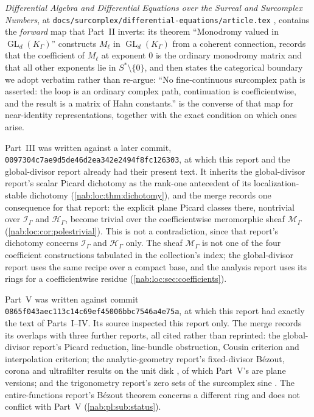 \documentclass[11pt,letterpaper]{article}
\theoremstyle{definition}
\theoremstyle{remark}
\newcommand{\HH}{\mathscr H_\Gamma}
\newcommand{\II}{\mathscr I_\Gamma}
\newcommand{\K}{K_\Gamma}
\newcommand{\GL}{\operatorname{GL}}
\newcommand{\MM}{\mathscr M_\Gamma}
\numberwithin{equation}{section}
\begin{document}
\emph{Differential Algebra and Differential Equations over the Surreal and
Surcomplex Numbers}, at
\texttt{docs/surcomplex/differential-equations/article.tex}
\cite{RepoDiff}, contains the \emph{forward} map that Part~II inverts: its
theorem ``Monodromy valued in $\GL_d(K_\Gamma)$'' constructs $M_\ell$ in
$\GL_d(\K)$ from a coherent connection, records that the coefficient of
$M_\ell$ at exponent $0$ is the ordinary monodromy matrix and that all other
exponents lie in $S^*\setminus\{0\}$, and then states the categorical
boundary we adopt verbatim rather than re-argue: ``No fine-continuous
surcomplex path is asserted: the loop is an ordinary complex path,
continuation is coefficientwise, and the result is a matrix of Hahn
constants.''  is the converse of that map for near-identity
representations, together with the exact condition on which ones arise.

Part~III was written against a later commit,
\texttt{0097304c7ae9d5de46d2ea342e2494f8fc126303}, at which this report and the
global-divisor report already had their present text. It inherits the
global-divisor report's scalar Picard dichotomy as the rank-one antecedent of
its localization-stable dichotomy (\cref{nab:loc:thm:dichotomy}), and the merge
records one consequence for that report: the explicit plane Picard classes there,
nontrivial over $\II$ and $\HH$, become trivial over the coefficientwise
meromorphic sheaf $\MM$ (\cref{nab:loc:cor:polestrivial}). This is not a
contradiction, since that report's dichotomy concerns $\II$ and $\HH$ only. The
sheaf $\MM$ is not one of the four coefficient constructions tabulated in the
collection's index; the global-divisor report uses the same recipe over a
compact base, and the analysis report \cite{RepoAnalysis} uses its rings for a
coefficientwise residue (\cref{nab:loc:sec:coefficients}).

Part~V was written against commit
\texttt{0865f043aec113c14c69ef45006bbc7546a4e75a}, at which this report had
exactly the text of Parts~I--IV. Its source inspected this report only. The
merge records its overlaps with three further reports, all cited rather than
reprinted: the global-divisor report's Picard reduction, line-bundle
obstruction, Cousin criterion and interpolation criterion; the
analytic-geometry report's fixed-divisor B\'ezout, corona and ultrafilter
results on the unit disk \cite{RepoGeometry}, of which Part~V's are plane
versions; and the trigonometry report's zero sets of the surcomplex sine
\cite{RepoTrig}. The entire-functions report's B\'ezout theorem
\cite{RepoEntire} concerns a different ring and does not conflict with
Part~V (\cref{nab:pl:sub:status}).
\end{document}
